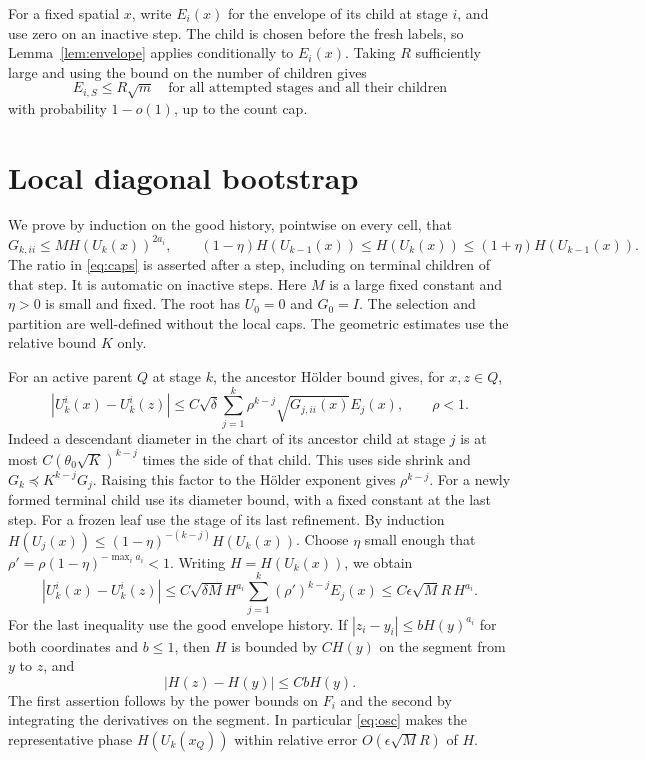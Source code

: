 \documentclass[11pt]{article}
\begin{document}
For a fixed spatial \(x\), write \(E_i(x)\) for the envelope of
its child at stage \(i\), and use zero on an inactive step.
The child is chosen before the fresh labels, so
Lemma~\ref{lem:envelope} applies conditionally to \(E_i(x)\).
Taking \(R\) sufficiently large and using the bound on the
number of children gives
\begin{equation}\label{eq:globalmax}
 E_{i,S}\le R\sqrt m
 \quad\text{for all attempted stages and all their children}
\end{equation}
with probability \(1-o(1)\), up to the count cap.

\section{Local diagonal bootstrap}

We prove by induction on the good history, pointwise on every
cell, that
\begin{equation}\label{eq:caps}
 G_{k,ii}\le M H(U_k(x))^{2a_i},\qquad
 (1-\eta) H(U_{k-1}(x))\le H(U_k(x))
       \le (1+\eta)H(U_{k-1}(x)).
\end{equation}
The ratio in \eqref{eq:caps} is asserted after a step, including
on terminal children of that step. It is automatic on inactive
steps. Here \(M\) is a large fixed constant and \(\eta>0\) is
small and fixed. The root has \(U_0=0\) and \(G_0=I\).
The selection and partition are well-defined without the local
caps. The geometric estimates use the relative bound \(K\) only.

For an active parent \(Q\) at stage \(k\), the ancestor H\"older
bound gives, for \(x,z\in Q\),
\[
 |U_k^i(x)-U_k^i(z)|
 \le C\sqrt\delta \sum_{j=1}^k
       \rho^{k-j}\sqrt{G_{j,ii}(x)} E_j(x), \qquad \rho<1 .
\]
Indeed a descendant diameter in the chart of its ancestor child
at stage \(j\) is at most \(C(\theta_0\sqrt K)^{k-j}\) times the
side of that child. This uses side shrink and
\(G_k\preceq K^{k-j}G_j\). Raising this factor to the H\"older
exponent gives \(\rho^{k-j}\). For a newly formed terminal
child use its diameter bound, with a fixed constant at the last
step. For a frozen leaf use the stage of its last refinement.
By induction
\(H(U_j(x))\le (1-\eta)^{-(k-j)}H(U_k(x))\).
Choose \(\eta\) small enough that
\(\rho'=\rho(1-\eta)^{-\max_i a_i}<1\).
Writing \(H=H(U_k(x))\), we obtain
\begin{equation}\label{eq:osc}
 |U_k^i(x)-U_k^i(z)|
 \le C \sqrt{\delta M} H^{a_i}
           \sum_{j=1}^k(\rho')^{k-j} E_j(x)
 \le C \epsilon\sqrt M R\,H^{a_i}.
\end{equation}
For the last inequality use the good envelope history.
If \(|z_i-y_i|\le b H(y)^{a_i}\) for both coordinates and
\(b\le1\), then \(H\) is bounded by \(C H(y)\) on the segment
from \(y\) to \(z\), and
\[
 |H(z)-H(y)|\le C b H(y).
\]
The first assertion follows by the power bounds on \(F_i\) and
the second by integrating the derivatives on the segment.
In particular \eqref{eq:osc} makes the representative phase
\(H(U_k(x_Q))\) within relative error \(O(\epsilon\sqrt M R)\)
of \(H\).
\end{document}

